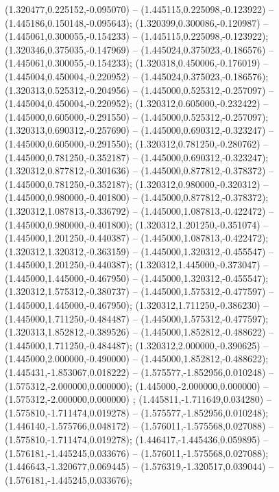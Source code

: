  (1.320477,0.225152,-0.095070) -- (1.445115,0.225098,-0.123922) -- (1.445186,0.150148,-0.095643);
 (1.320399,0.300086,-0.120987) -- (1.445061,0.300055,-0.154233) -- (1.445115,0.225098,-0.123922);
 (1.320346,0.375035,-0.147969) -- (1.445024,0.375023,-0.186576) -- (1.445061,0.300055,-0.154233);
 (1.320318,0.450006,-0.176019) -- (1.445004,0.450004,-0.220952) -- (1.445024,0.375023,-0.186576);
 (1.320313,0.525312,-0.204956) -- (1.445000,0.525312,-0.257097) -- (1.445004,0.450004,-0.220952);
 (1.320312,0.605000,-0.232422) -- (1.445000,0.605000,-0.291550) -- (1.445000,0.525312,-0.257097);
 (1.320313,0.690312,-0.257690) -- (1.445000,0.690312,-0.323247) -- (1.445000,0.605000,-0.291550);
 (1.320312,0.781250,-0.280762) -- (1.445000,0.781250,-0.352187) -- (1.445000,0.690312,-0.323247);
 (1.320312,0.877812,-0.301636) -- (1.445000,0.877812,-0.378372) -- (1.445000,0.781250,-0.352187);
 (1.320312,0.980000,-0.320312) -- (1.445000,0.980000,-0.401800) -- (1.445000,0.877812,-0.378372);
 (1.320312,1.087813,-0.336792) -- (1.445000,1.087813,-0.422472) -- (1.445000,0.980000,-0.401800);
 (1.320312,1.201250,-0.351074) -- (1.445000,1.201250,-0.440387) -- (1.445000,1.087813,-0.422472);
 (1.320312,1.320312,-0.363159) -- (1.445000,1.320312,-0.455547) -- (1.445000,1.201250,-0.440387);
 (1.320312,1.445000,-0.373047) -- (1.445000,1.445000,-0.467950) -- (1.445000,1.320312,-0.455547);
 (1.320312,1.575312,-0.380737) -- (1.445000,1.575312,-0.477597) -- (1.445000,1.445000,-0.467950);
 (1.320312,1.711250,-0.386230) -- (1.445000,1.711250,-0.484487) -- (1.445000,1.575312,-0.477597);
 (1.320313,1.852812,-0.389526) -- (1.445000,1.852812,-0.488622) -- (1.445000,1.711250,-0.484487);
 (1.320312,2.000000,-0.390625) -- (1.445000,2.000000,-0.490000) -- (1.445000,1.852812,-0.488622);
 (1.445431,-1.853067,0.018222) -- (1.575577,-1.852956,0.010248) -- (1.575312,-2.000000,0.000000);
 (1.445000,-2.000000,0.000000) -- (1.575312,-2.000000,0.000000) ;
 (1.445811,-1.711649,0.034280) -- (1.575810,-1.711474,0.019278) -- (1.575577,-1.852956,0.010248);
 (1.446140,-1.575766,0.048172) -- (1.576011,-1.575568,0.027088) -- (1.575810,-1.711474,0.019278);
 (1.446417,-1.445436,0.059895) -- (1.576181,-1.445245,0.033676) -- (1.576011,-1.575568,0.027088);
 (1.446643,-1.320677,0.069445) -- (1.576319,-1.320517,0.039044) -- (1.576181,-1.445245,0.033676);
